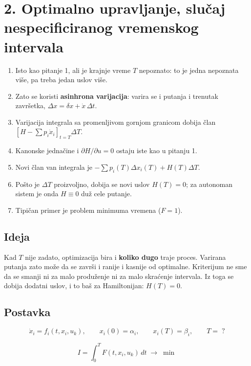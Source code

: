\documentclass[11pt,a4paper,parskip=half,headsepline,numbers=noenddot]{scrartcl}
\begin{document}
\section{2. Optimalno upravljanje, slučaj nespecificiranog vremenskog intervala}

\begin{kljucna}
\begin{enumerate}
\def\labelenumi{\arabic{enumi}.}
\item Isto kao pitanje 1, ali je krajnje vreme \(T\) nepoznato: to je jedna nepoznata više, pa treba jedan uslov više.
\item Zato se koristi \textbf{asinhrona varijacija}: varira se i putanja i trenutak završetka, \(\Delta x = \delta x + \dot x\,\Delta t\).
\item Varijacija integrala sa promenljivom gornjom granicom dobija član \([H - \sum p_i\dot x_i]_{t=T}\Delta T\).
\item Kanonske jednačine i \(\partial H/\partial u = 0\) ostaju iste kao u pitanju 1.
\item Novi član van integrala je \(-\sum p_i(T)\Delta x_i(T) + H(T)\Delta T\).
\item Pošto je \(\Delta T\) proizvoljno, dobija se novi uslov \(H(T) = 0\); za autonoman sistem je onda \(H \equiv 0\) duž cele putanje.
\item Tipičan primer je problem minimuma vremena (\(F = 1\)).
\end{enumerate}
\end{kljucna}

\subsection{Ideja}

Kad \(T\) nije zadato, optimizacija bira i \textbf{koliko dugo} traje proces. Varirana putanja zato može da se završi i ranije i kasnije od optimalne. Kriterijum ne sme da se smanji ni za malo produženje ni za malo skraćenje intervala. Iz toga se dobija dodatni uslov, i to baš za Hamiltonijan: \(H(T) = 0\).

\subsection{Postavka}

\[\dot x_i = f_i(t, x_i, u_k), \qquad x_i(0) = \alpha_i, \qquad x_i(T) = \beta_i, \qquad T = \;?\]

\[I = \int_0^T F(t, x_i, u_k)\,dt \;\to\; \min\]
\end{document}
